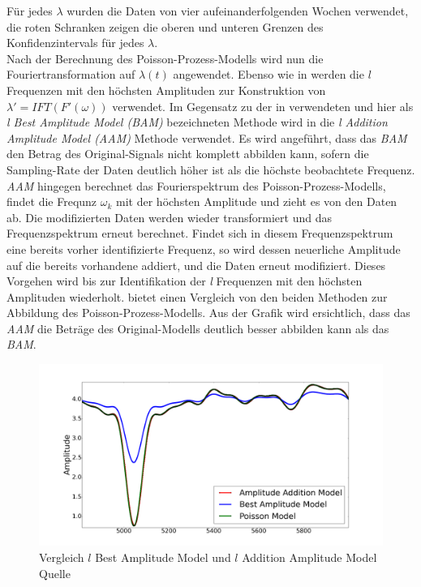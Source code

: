 Für jedes $\lambda$ wurden die Daten von vier aufeinanderfolgenden Wochen verwendet, die roten Schranken zeigen die oberen und unteren Grenzen des Konfidenzintervals für jedes $\lambda$. \\
Nach der Berechnung des Poisson-Prozess-Modells wird nun die Fouriertransformation auf $\lambda (t)$ angewendet. Ebenso wie in \cite{Krajnik.2014} werden die $l$ Frequenzen mit den höchsten Amplituden zur Konstruktion von $\lambda' = IFT(F'(\omega))$ verwendet. Im Gegensatz zu der in \cite{Krajnik.2014} verwendeten und hier als \textit{l Best Amplitude Model (BAM)} bezeichneten Methode wird in \cite{Jovan.2016} die \textit{l Addition Amplitude Model (AAM)} Methode verwendet. Es wird angeführt, dass das \textit{BAM} den Betrag des Original-Signals nicht komplett abbilden kann, sofern die Sampling-Rate der Daten deutlich höher ist als die höchste beobachtete Frequenz. \\ \textit{AAM} hingegen berechnet das Fourierspektrum des Poisson-Prozess-Modells, findet die Frequnz $\omega_k$ mit der höchsten Amplitude und zieht es von den Daten ab. Die modifizierten Daten werden wieder transformiert und das Frequenzspektrum erneut berechnet. Findet sich in diesem Frequenzspektrum eine bereits vorher identifizierte Frequenz, so wird dessen neuerliche Amplitude auf die bereits vorhandene addiert, und die Daten erneut modifiziert. Dieses Vorgehen wird bis zur Identifikation der \textit{l} Frequenzen mit den höchsten Amplituden wiederholt.  bietet einen Vergleich von den beiden Methoden zur Abbildung des Poisson-Prozess-Modells. Aus der Grafik wird ersichtlich, dass das \textit{AAM} die Beträge des Original-Modells deutlich besser abbilden kann als das \textit{BAM}.

\begin{figure}[!ht]
	\centering
	\includegraphics[width=0.7\linewidth]{Abbildungen/stand_der_technik/BAM_AAM}
	\caption{Vergleich $l$ Best Amplitude Model und $l$ Addition Amplitude Model Quelle \cite{Jovan.2016}}
	\label{fig.BAM_AAM_Vergleich}
\end{figure}

